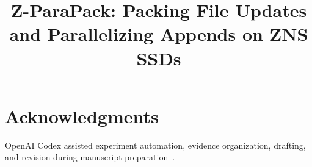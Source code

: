 \documentclass[conference,10pt,letterpaper]{IEEEtran}
\title{Z-ParaPack: Packing File Updates and Parallelizing Appends on ZNS SSDs}
\author{\IEEEauthorblockN{Anonymous Authors}}
\begin{document}
\maketitle
\pagestyle{plain}
\thispagestyle{plain}







\section*{Acknowledgments}
OpenAI Codex assisted experiment automation, evidence organization, drafting, and revision during manuscript preparation~\cite{r16}.
%


\end{document}
